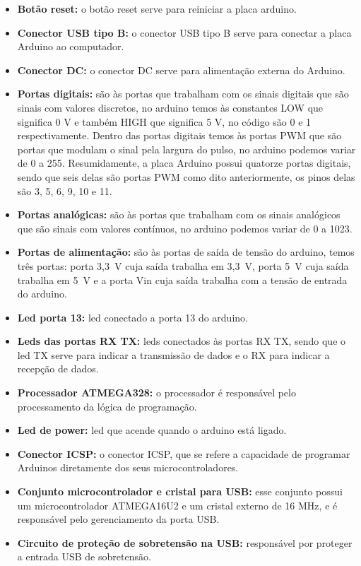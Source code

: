 \begin{itemize}
\item \textbf{Botão reset:} o botão reset serve para reiniciar a placa arduino.
\item \textbf{Conector \ac{USB} tipo B:} o conector \ac{USB} tipo B serve para conectar a placa Arduino ao computador.
\item \textbf{Conector DC:} o conector DC serve para alimentação externa do Arduino.
\item \textbf{Portas digitais:} são às portas que trabalham com os sinais digitais que são sinais com valores discretos, no arduino temos às constantes LOW que significa 0 V e também HIGH que significa 5 V, no código são 0 e 1 respectivamente. Dentro das portas digitais temos às portas \ac{PWM} que são portas que modulam o sinal pela largura do pulso, no arduino podemos variar de 0 a 255. Resumidamente, a placa Arduino possui quatorze portas digitais, sendo que seis delas são portas \ac{PWM} como dito anteriormente, os pinos delas são 3, 5, 6, 9, 10 e 11.
\item \textbf{Portas analógicas:} são às portas que trabalham com os sinais analógicos que são sinais com valores contínuos, no arduino podemos variar de 0 a 1023.
\item \textbf{Portas de alimentação:} são às portas de saída de tensão do arduino, temos três portas: porta 3,3~V cuja saída trabalha em 3,3~V, porta 5~V cuja saída trabalha em 5~V e a porta Vin cuja saída trabalha com a tensão de entrada do arduino.
\item \textbf{Led porta 13:} led conectado a porta 13 do arduino.
\item \textbf{Leds das portas RX TX:} leds conectados às portas RX TX, sendo que o led TX serve para indicar a transmissão de dados e o RX para indicar a recepção de dados.
\item \textbf{Processador ATMEGA328:} o processador é responsável pelo processamento da lógica de programação.
\item \textbf{Led de power:} led que acende quando o arduino está ligado.
\item \textbf{Conector \ac{ICSP}:} o conector \ac{ICSP}, que se refere a capacidade de programar Arduinos diretamente dos seus microcontroladores. 
\item \textbf{Conjunto microcontrolador e cristal para \ac{USB}:} esse conjunto possui um microcontrolador ATMEGA16U2 e um cristal externo de 16 MHz, e é responsável pelo gerenciamento da porta \ac{USB}.
\item \textbf{Circuito de proteção de sobretensão na \ac{USB}:} responsável por proteger a entrada \ac{USB} de sobretensão.

\end{itemize}
